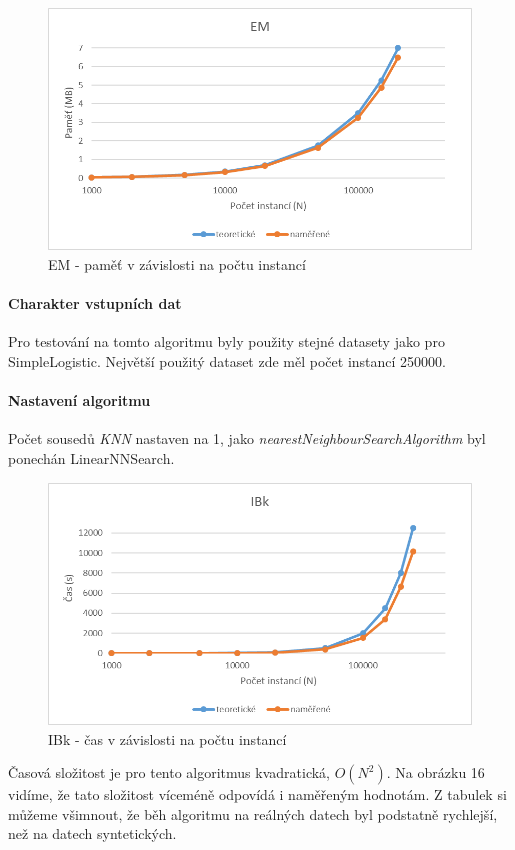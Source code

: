 \documentclass[12pt]{article}
\begin{document}
\begin{figure}[hbp]
  \centering
  \includegraphics[scale=1]{img/emp.png}
  \caption{EM - paměť v závislosti na počtu instancí}
\end{figure}

\newpage
{}
\paragraph{Charakter vstupních dat}
Pro testování na tomto algoritmu byly použity stejné datasety jako pro SimpleLogistic. Největší použitý dataset zde měl počet instancí 250000.
\paragraph{Nastavení algoritmu}
Počet sousedů \textit{KNN} nastaven na 1, jako \textit{nearestNeighbourSearchAlgorithm} byl ponechán LinearNNSearch.
\begin{figure}[hbp]
  \centering
  \includegraphics[scale=1]{img/ibk.png}
  \caption{IBk - čas v závislosti na počtu instancí}
\end{figure}
Časová složitost je pro tento algoritmus kvadratická, $O(N^2)$. Na obrázku 16 vidíme, že tato složitost víceméně odpovídá i naměřeným hodnotám. Z tabulek si můžeme všimnout, že běh algoritmu na reálných datech byl podstatně rychlejší, než na datech syntetických.
\end{document}
